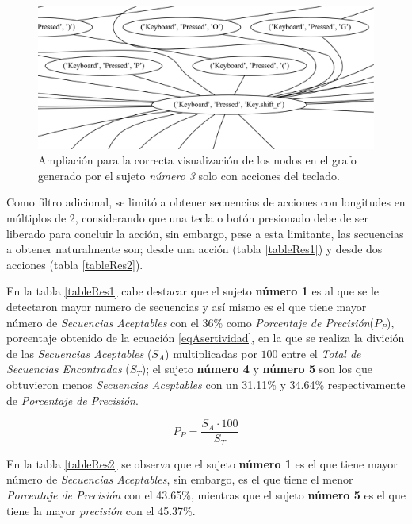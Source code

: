 \begin{figure}[h]
\centering
\includegraphics[width=1.0 \columnwidth]{chap5/Imagenes/MoreZKB150.eps}
\caption{Ampliaci\'on para la correcta visualizaci\'on de los nodos en el
 grafo generado por el sujeto \emph{n\'umero 3} solo con acciones del
 teclado.}
\label{fig:morezKB}
\end{figure}


Como filtro adicional, se limit\'o a obtener secuencias de 
 acciones con longitudes en m\'ultiplos de 2, considerando que una tecla o 
 bot\'on presionado debe de ser liberado para concluir la acci\'on, sin 
 embargo, pese a esta limitante, las secuencias a obtener naturalmente son; 
 desde una acci\'on (tabla \ref{tableRes1}) y desde dos acciones (tabla 
 \ref{tableRes2}). 
 

En la tabla \ref{tableRes1} cabe destacar que el sujeto \textbf{n\'umero 1}
 es al que se le detectaron mayor numero de secuencias y as\'i mismo es el 
 que tiene mayor n\'umero de \emph{Secuencias Aceptables} con el 36\% como
 \emph{Porcentaje de Precisi\'on}($P_P$), porcentaje obtenido de la ecuaci\'on
 \ref{eqAsertividad}, en la que se realiza la divici\'on de las 
 \emph{Secuencias Aceptables} ($S_A$) multiplicadas por $100$ entre el 
 \emph{Total de Secuencias Encontradas} ($S_T$); el sujeto \textbf{n\'umero 
 4} y \textbf{n\'umero 5} son los que obtuvieron menos \emph{Secuencias
 Aceptables} con un 31.11\%  y 34.64\% respectivamente de \emph{Porcentaje
 de Precisi\'on}.


\begin{equation}
P_P = \dfrac{ S_A \cdot 100}{S_T}
\label{eqAsertividad}
\end{equation}
 
 
En la tabla \ref{tableRes2} se observa que el sujeto \textbf{n\'umero 1} es 
 el que tiene mayor n\'umero de \emph{Secuencias Aceptables}, sin embargo, 
 es el que tiene el menor \emph{Porcentaje de Precisi\'on} con el 43.65\%, 
 mientras que el sujeto \textbf{n\'umero 5} es el que tiene la mayor
 \emph{precisi\'on} con el 45.37\%.


